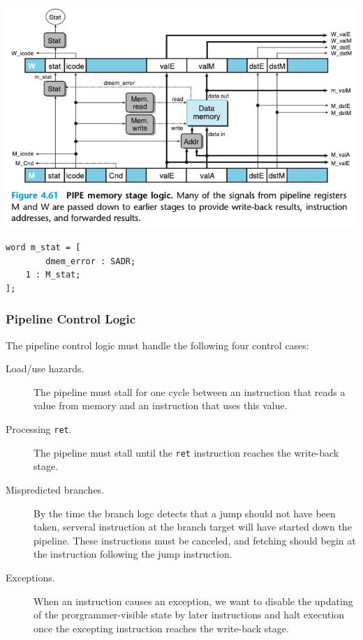 \documentclass[11pt]{article}
\begin{document}
\begin{enumerate}
\begin{center}
\includegraphics[width=.9\linewidth]{pics/figure4.61-pipe-memory-stage-logic.png}
\end{center}


\begin{verbatim}
word m_stat = [
        dmem_error : SADR;
	1 : M_stat;
];
\end{verbatim}
\end{enumerate}

\subsubsection{Pipeline Control Logic}
\label{sec:org9c4879f}

The pipeline control logic must handle the following four control cases:\\
\begin{description}
\item[{Load/use hazards.}] The pipeline must stall for one cycle between an instruction that reads a value from memory and an instruction that uses this value.\\
\item[{Processing \texttt{ret}.}] The pipeline must stall until the \texttt{ret} instruction reaches the write-back stage.\\
\item[{Mispredicted branches.}] By the time the branch logc detects that a jump should not have been taken, serveral instruction at the branch target will have started down the pipeline. These instructions must be canceled, and fetching should begin at the instruction following the jump instruction.\\
\item[{Exceptions.}] When an instruction causes an exception, we want to disable the updating of the prorgrammer-visible state by later instructions and halt execution once the excepting instruction reaches the write-back stage.\\
\end{description}
\end{document}
